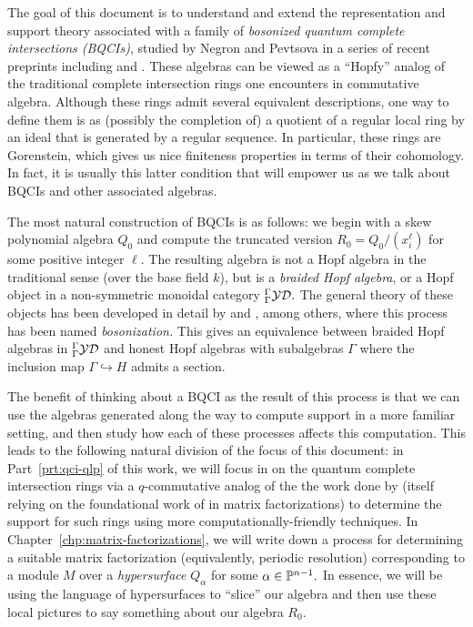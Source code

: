 \documentclass [11pt, proquest] {uwthesis}[2020/02/24]
\begin{document}
    The goal of this document is to understand and extend the representation and support theory associated with a family of \textit{bosonized quantum complete intersections (BQCIs)}, studied by Negron and Pevtsova in a series of recent preprints including \cite{negron-pevtsovaI} and \cite{negron-pevtsovaII}. These algebras can be viewed as a ``Hopfy'' analog of the traditional complete intersection rings one encounters in commutative algebra. Although these rings admit several equivalent descriptions, one way to define them is as (possibly the completion of) a quotient of a regular local ring by an ideal that is generated by a regular sequence. In particular, these rings are Gorenstein, which gives us nice finiteness properties in terms of their cohomology. In fact, it is usually this latter condition that will empower us as we talk about BQCIs and other associated algebras.
    
    The most natural construction of BQCIs is as follows: we begin with a skew polynomial algebra $Q_0$ and compute the truncated version $R_0=Q_0/(x_i^\ell)$ for some positive integer $\ell$. The resulting algebra is not a Hopf algebra in the traditional sense (over the base field $k$), but is a \textit{braided Hopf algebra}, or a Hopf object in a non-symmetric monoidal category ${^\Gamma_\Gamma\mathcal{YD}}.$ The general theory of these objects has been developed in detail by \cite{majid-bosonization} and \cite{radford-product}, among others, where this process has been named \textit{bosonization.} This gives an equivalence between braided Hopf algebras in ${^\Gamma_\Gamma\mathcal{YD}}$ and honest Hopf algebras with subalgebras $\Gamma$ where the inclusion map $\Gamma\hookrightarrow H$ admits a section.
    
    The benefit of thinking about a BQCI as the result of this process is that we can use the algebras generated along the way to compute support in a more familiar setting, and then study how each of these processes affects this computation. This leads to the following natural division of the focus of this document: in Part~\ref{prt:qci-qlp} of this work, we will focus in on the quantum complete intersection rings via a $q$-commutative analog of the the work done by \cite{avramov-iyengar} (itself relying on the foundational work of \cite{eisenbud80} in matrix factorizations) to determine the support for such rings using more computationally-friendly techniques. In Chapter~\ref{chp:matrix-factorizations}, we will write down a process for determining a suitable matrix factorization (equivalently, periodic resolution) corresponding to a module $M$ over a \textit{hypersurface} $Q_\alpha$ for some $\alpha\in\mathbb{P}^{n-1}.$ In essence, we will be using the language of hypersurfaces to ``slice'' our algebra and then use these local pictures to say something about our algebra $R_0.$ 
    
\end{document}
